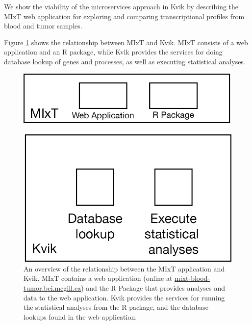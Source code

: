 %
%
We show the viability of the microservices approach in Kvik by describing the
MIxT web application for exploring and comparing
transcriptional profiles from blood and tumor samples. 

Figure \ref{kvik-mixt} shows the relationship between MIxT and Kvik. MIxT
consists of a web application and an R package, while Kvik provides the services
for doing database lookup of genes and processes, as well as executing
statistical analyses. 


\begin{figure}[h!]
\centering
\includegraphics{figures/kvik-mixt.png}
\caption{An overview of the relationship between the MIxT application and Kvik.
MIxT contains a web application (online at \url{mixt-blood-tumor.bci.mcgill.ca})
and the R Package that provides analyses and data to the web application. Kvik
provides the services for running the statistical analyses from the R package,
and the database lookups found in the web application.} 
\label{kvik-mixt}
\end{figure} 

